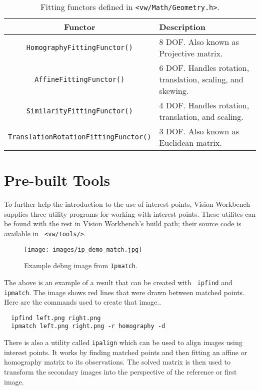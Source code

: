 \begin{table}[h]\begin{centering}
\begin{tabular}{|c|l|} \hline
Functor & Description \\ \hline \hline
\verb#HomographyFittingFunctor()# & 8 DOF. Also known as Projective matrix. \\ \hline
\verb#AffineFittingFunctor()# & 6 DOF. Handles rotation, translation, scaling, and skewing. \\ \hline
\verb#SimilarityFittingFunctor()# & 4 DOF. Handles rotation, translation, and scaling. \\ \hline
\verb#TranslationRotationFittingFunctor()# & 3 DOF. Also known as Euclidean matrix. \\ \hline
\end{tabular}
\caption{Fitting functors defined in {\tt <vw/Math/Geometry.h>}.}
\label{tbl:fitting-functors}
\end{centering}\end{table}

\section{Pre-built Tools}

To further help the introduction to the use of interest points,
Vision Workbench supplies three utility programs for working with interest
points. These utilites can be found with the rest in
Vision Workbench's build path; their source code is available in {\tt
  <vw/tools/>}.

\begin{figure}[h]
\begin{center}
  \texttt{[image: images/ip\_demo\_match.jpg]}
\end{center}
\caption{Example debug image from {\tt Ipmatch}.}
\label{fig:demo}
\end{figure}

The above is an example of a result that can be created with {\tt
  ipfind} and {\tt ipmatch}. The image shows red lines that were drawn
between matched points. Here are the commands used to create that image..

\begin{verbatim}
  ipfind left.png right.png
  ipmatch left.png right.png -r homography -d
\end{verbatim}

There is also a utility called {\tt ipalign} which can be used to
align images using interest points. It works by finding matched points
and then fitting an affine or homography matrix to its
observations. The solved matrix is then used to transform the
secondary images into the perspective of the reference or first image.

